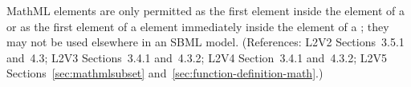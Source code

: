 MathML  elements are only permitted as the first element
inside the  element of a \FunctionDefinition or as the
first element of a  element immediately inside the
 element of a \FunctionDefinition; they may not be used
elsewhere in an SBML model.  (References: L2V2 Sections~3.5.1 and~4.3;
L2V3 Sections~3.4.1 and~4.3.2; L2V4 Section~3.4.1 and~4.3.2; L2V5 Sections~\ref{sec:mathmlsubset} and~\ref{sec:function-definition-math}.)

